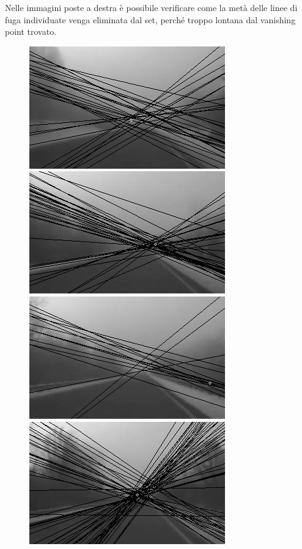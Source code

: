 \documentclass[12pt]{report}
\begin{document}
\noindent Nelle immagini poste a destra \`e possibile verificare come la met\`a delle linee di fuga individuate venga eliminata dal set, perch\'e troppo lontana dal vanishing point trovato.\\

\newcommand{\imTrackScale}{0.7}
\begin{figure}[H]
\begin{minipage}[c]{0.5\linewidth}
	\centering
	\includegraphics[scale=\imTrackScale]{images/bF_0000_15.png}
	\includegraphics[scale=\imTrackScale]{images/bF_0020_15.png}
	\includegraphics[scale=\imTrackScale]{images/bF_0040_15.png}
	\includegraphics[scale=\imTrackScale]{images/bF_0060_15.png}

\end{minipage}
\end{figure}
\end{document}
